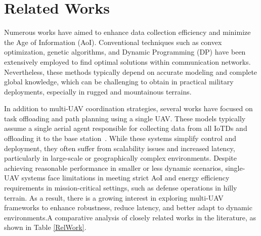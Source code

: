 \documentclass[conference]{IEEEtran}
\begin{document}
\section{Related Works}
Numerous works have aimed to enhance data collection efficiency and minimize the Age of Information (AoI)\cite{liu2022aoi,baek2019energy}. Conventional techniques such as convex optimization, genetic algorithms, and Dynamic Programming (DP) have been extensively employed to find optimal solutions within communication networks\cite{liu2022aoi,baek2019energy}. Nevertheless, these methods typically depend on accurate modeling and complete global knowledge, which can be challenging to obtain in practical military deployments, especially in rugged and mountainous terrains.

In addition to multi-UAV coordination strategies, several works have focused on task offloading and path planning using a single UAV. These models typically assume a single aerial agent responsible for collecting data from all IoTDs and offloading it to the base station~\cite{SingleAgentPPO}. While these systems simplify control and deployment, they often suffer from scalability issues and increased latency, particularly in large-scale or geographically complex environments. Despite achieving reasonable performance in smaller or less dynamic scenarios, single-UAV systems face limitations in meeting strict AoI and energy efficiency requirements in mission-critical settings, such as defense operations in hilly terrain. As a result, there is a growing interest in exploring multi-UAV frameworks to enhance robustness, reduce latency, and better adapt to dynamic environments.A comparative analysis of closely related works in the literature, as shown in Table \ref{RelWork}. 

\end{document}
